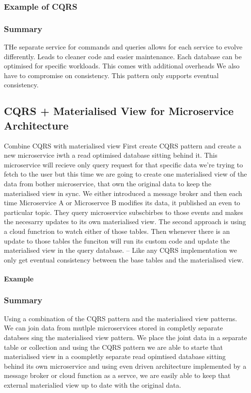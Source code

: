 \documentclass[a4paper, 11pt]{book}
\begin{document}
    \subsubsection{Example of CQRS}

    \subsubsection{Summary}
    THe separate service for commands and queries allows for each service to evolve differently.
    Leads to cleaner code and easier maintenance.
    Each database can be optimised for specific workloads.
    This comes with additional overheads
    We also have to compromise on consistency.
    This pattern only supports eventual consistency.

    \subsection{CQRS + Materialised View for Microservice Architecture}
    Combine CQRS with materialised view
    First create CQRS pattern and create a new microservice iwth a read optimised database sitting behind it.
    This microservice will recieve only query request for that specific data we're trying to fetch to the user but this time we are going to create one materialised view of the data from bother microservice, that own the original data to keep the materialised view in sync.
    We either introduced a message broker and then each time Microservice A or Microservce B modifies its data, it published an even to particular topic.
    They query microservice subscbirbes to those events and makes the necesarry updates to its own materialised view.
    The second approach is using a cloud functrion to watch either of those tables.
    Then whenever there is an update to those tables the funciton will run its custom code and update the materialised view in the query database.
    -- Like any CQRS implementation we only get eventual consistency between the base tables and the materialised view.

    \paragraph{Example}

    \subsubsection{Summary}
    Using a combination of the CQRS pattern and the materialised view patterns.
    We can join data from mutlple microservices stored in completly separate databses sing the materialised view pattern.
    We place the joint data in a separate table or collection and using the CQRS pattern we are able to starte that materialised view in a coompletly separate read opimtised database sitting behind its own microservice and using even driven architecture implemented by a message broker or cloud function as a servce, we are easily able to keep that external materialied view up to date with the original data.
\end{document}

